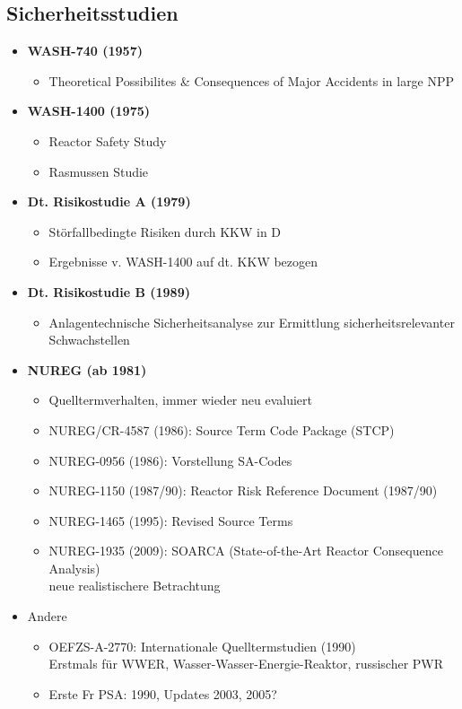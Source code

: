\documentclass[12pt]{article}
\begin{document}
\subsection{Sicherheitsstudien}
\begin{itemize}
	\item \textbf{WASH-740 (1957)}
		\begin{itemize}
			\item Theoretical Possibilites \& Consequences of Major Accidents in large NPP
		\end{itemize}

	\item \textbf{WASH-1400 (1975)}
		\begin{itemize}
			\item Reactor Safety Study
			\item Rasmussen Studie
		\end{itemize}

	\item \textbf{Dt. Risikostudie A (1979)}
		\begin{itemize}
			\item Störfallbedingte Risiken durch KKW in D
			\item Ergebnisse v. WASH-1400 auf dt. KKW bezogen
		\end{itemize}

	\item \textbf{Dt. Risikostudie B (1989)}
		\begin{itemize}
			\item Anlagentechnische Sicherheitsanalyse zur Ermittlung sicherheitsrelevanter Schwachstellen
		\end{itemize}

	\item \textbf{NUREG (ab 1981)}
		\begin{itemize}
			\item Quelltermverhalten, immer wieder neu evaluiert
			\item NUREG/CR-4587 (1986): Source Term Code Package (STCP)
			\item NUREG-0956 (1986): Vorstellung SA-Codes
			\item NUREG-1150 (1987/90): Reactor Risk Reference Document (1987/90)
			\item NUREG-1465 (1995): Revised Source Terms
			\item NUREG-1935 (2009): SOARCA (State-of-the-Art Reactor Consequence Analysis)\\
				neue realistischere Betrachtung
		\end{itemize}

	\item Andere
		\begin{itemize}
			\item OEFZS-A-2770: Internationale Quelltermstudien (1990)\\
				Erstmals für WWER, Wasser-Wasser-Energie-Reaktor, russischer PWR
			\item Erste Fr PSA: 1990, Updates 2003, 2005?
		\end{itemize}

\end{itemize}
\end{document}
